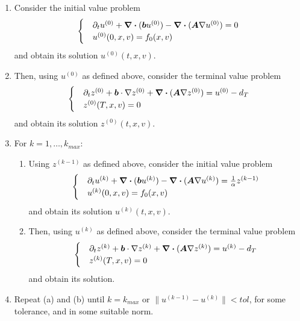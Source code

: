 \documentclass{article}  %
\begin{document}
\begin{enumerate}
    \item Consider the initial value problem
    \begin{align} 
        \begin{cases}
        &\partial_t u^{(0)} + \div{(\boldsymbol{b}u^{(0)})} - \div{(\boldsymbol{A} \nabla u^{(0)})} = 0\\
        &u^{(0)}(0,x,v) = f_0(x,v)
        \end{cases}
    \end{align}
    and obtain its solution $u^{(0)}(t,x,v)$.
    \item Then, using $u^{(0)}$ as defined above, consider the terminal value problem 
    \begin{align} 
        \begin{cases} 
            &\partial_t z^{(0)} + \boldsymbol{b} \cdot \nabla z^{(0)} + \div{(\boldsymbol{A} \nabla z^{(0)})} = u^{(0)} - d_T\\
            &z^{(0)}(T,x,v) = 0
        \end{cases}
    \end{align}
    and obtain its solution $z^{(0)}(t,x,v)$.
    \item For $k=1,\dots,k_{max}$:
    \begin{enumerate}
        \item Using $z^{(k-1)}$ as defined above, consider the initial value problem 
        \begin{align}
            \label{eq:primal-iteration} 
            \begin{cases}
                &\partial_t u^{(k)} + \div{(\boldsymbol{b}u^{(k)})} - \div{(\boldsymbol{A} \nabla u^{(k)})} = \frac{1}{\alpha} z^{(k-1)}\\
                &u^{(k)}(0,x,v) = f_0(x,v)
            \end{cases}
        \end{align}
        and obtain its solution $u^{(k)}(t,x,v)$.
        \item Then, using $u^{(k)}$ as defined above, consider the terminal value problem 
        \begin{align}
            \label{eq:dual-iteration}
            \begin{cases}
                &\partial_t z^{(k)} + \boldsymbol{b} \cdot \nabla z^{(k)} + \div{(\boldsymbol{A} \nabla z^{(k)})} = u^{(k)} - d_T\\
                &z^{(k)}(T,x,v) = 0
            \end{cases} 
        \end{align} 
        and obtain its solution.
    \end{enumerate}
    \item Repeat (a) and (b) until $k=k_{max}$ or $\lVert u^{(k-1)} - u^{(k)} \rVert < tol$, for some tolerance, and in some suitable norm.
\end{enumerate}
\end{document}
